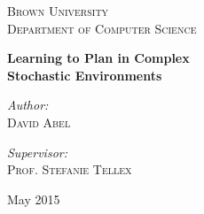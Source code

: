 \documentclass[11pt]{article}
\begin{document}
\begin{titlepage}
\begin{center}
\vfill
\textsc{\Large Brown University \\ Department of Computer Science}\\[1.5cm]

\vspace{55mm}

{ \huge \bfseries Learning to Plan in Complex  \\Stochastic Environments \\[0.9cm] }

\noindent
\begin{minipage}[t]{0.4\textwidth}
\begin{flushleft} \large
\emph{Author:}\\
\textsc{David Abel}
\end{flushleft}
\end{minipage}%
\begin{minipage}[t]{0.4\textwidth}
\begin{flushright} \large
\emph{Supervisor:} \\
\textsc{Prof. Stefanie Tellex}
\end{flushright}
\end{minipage}



\vfill
{\large May 2015}

\end{center}
\end{titlepage}

\newpage
\end{document}

